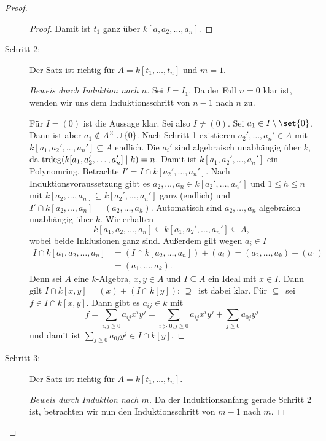 \documentclass[12pt,a4paper]{scrartcl}
\theoremstyle{cplain}
\theoremstyle{cdef}
\begin{document}
\begin{proof}
\begin{description}
\begin{proof}
			Damit ist $t_1$ ganz über $k[a, a_2,\dots, a_n]$.
		\end{proof}

		\item[Schritt 2:] Der Satz ist richtig für $A = k[t_1,\dots, t_n]$ und $m = 1$.
		\begin{proof}[Beweis durch Induktion nach $n$]
			Sei $I=I_1$. Da der Fall $n=0$ klar ist, wenden wir uns dem Induktionsschritt von $n-1$ nach $n$ zu.
		
			Für $I = (0)$ ist die Aussage klar. Sei also $I \neq (0)$. Sei $a_1\in I\setminus\set{0}$. Dann ist aber $a_1\notin A^{\times}\cup\{0\}$. Nach Schritt 1 existieren $a_2', \dots, a_n'\in A$ mit $k[a_1, a_2',\dots, a_n']\subseteq A$ endlich. Die $a_i'$ sind algebraisch unabhängig über $k$, da $\operatorname{trdeg}(k[a_1,a_2',\dots, a_n']\mid k) = n$. Damit ist $k[a_1, a_2',\dots, a_n']$ ein Polynomring. Betrachte $I' = I\cap k[a_2',\dots, a_n']$. Nach Induktionsvoraussetzung gibt es $a_2,\dots, a_n\in k[a_2',\dots, a_n']$ und $1 \le h \le n$ mit $k[a_2,\dots, a_n]\subseteq k[a_2',\dots, a_n']$ ganz (endlich) und $I'\cap k[a_2,\dots, a_n] = (a_2,\dots, a_h)$.
			Automatisch sind $a_2,\dots, a_n$ algebraisch unabhängig über $k$. Wir erhalten
			\[k[a_1,a_2,\dots, a_n]\subseteq k[a_1,a_2',\dots, a_n']\subseteq A,\]
			wobei beide Inklusionen ganz sind. Außerdem gilt wegen $a_i\in I$
			\begin{align*}
				I\cap k[a_1,a_2,\dots, a_n] &= (I\cap k[a_2,\dots, a_n]) + (a_i) = (a_2, \dots, a_k) + (a_1) \\ &= (a_1,\dots, a_k).
			\end{align*}
			Denn sei $A$ eine $k$-Algebra, $x,y\in A$ und $I\subseteq A$ ein Ideal mit $x\in I$. Dann gilt $I\cap k[x,y] = (x) + (I\cap k[y])$: \glqq$\supseteq$\grqq\ ist dabei klar. Für \glqq$\subseteq$\grqq\ sei $f\in I\cap k[x,y]$. Dann gibt es $a_{ij}\in k$ mit
			\[f = \sum_{i,j\ge 0}a_{ij}x^iy^j = \sum_{i>0, j\ge0}a_{ij}x^{i}y^j + \sum_{j\ge 0} a_{0j}y^j\]
			und damit ist $\sum_{j\ge 0}a_{0j}y^j\in I\cap k[y]$.
		\end{proof}
		
		\item[Schritt 3:] Der Satz ist richtig für $ A = k[t_1,\dots, t_n]$.
		\begin{proof}[Beweis durch Induktion nach $m$]
			Da der Induktionsanfang gerade Schritt 2 ist, betrachten wir nun den Induktionsschritt von $m-1$ nach $m$.


\end{proof}
\end{description}
\end{proof}
\end{document}
